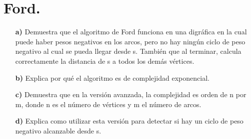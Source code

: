 \documentclass[12pt]{article}
\begin{document}
\section{Ford.}
\begin{itemize}
  \item[\bf{a)}] Demuestra que el algoritmo de Ford funciona en una digráfica en la cual puede haber pesos negativos en los arcos, pero no hay ningún ciclo de peso negativo al cual se pueda llegar desde s. También que al terminar, calcula correctamente la distancia de s a todos
los demás vértices.

\item[\bf{b)}] Explica por qué el algoritmo es de complejidad exponencial.
  
\item[\bf{c)}] Demuestra que en la versión avanzada, la complejidad es orden de n por m, donde n es
el número de vértices y m el número de arcos.

\item[\bf{d)}] Explica como utilizar esta versión para detectar si hay un ciclo de peso negativo alcanzable desde s.

\end{itemize}
\end{document}
